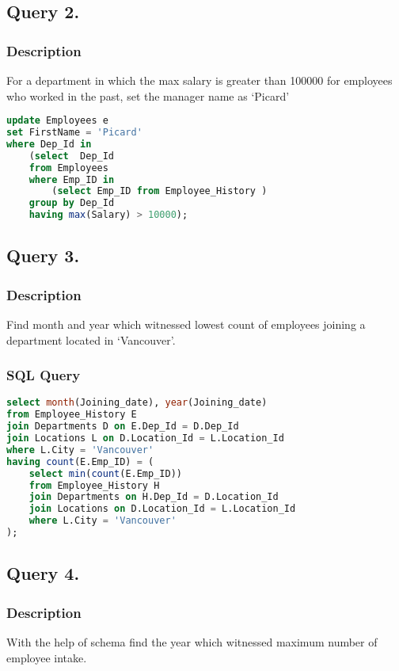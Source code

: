 \documentclass[a4paper]{article}
\begin{document}
\subsection{Query 2.}
\subsubsection{Description}
For a department in which the max salary is greater than 100000 for employees
who worked in the past, set the manager name as ‘Picard’
\begin{lstlisting}[language=SQL]
update Employees e
set FirstName = 'Picard' 
where Dep_Id in 
    (select  Dep_Id 
    from Employees
    where Emp_ID in 
        (select Emp_ID from Employee_History )
    group by Dep_Id
    having max(Salary) > 10000);
\end{lstlisting}

\newpage
\subsection{Query 3.}
\subsubsection{Description}
Find month and year which witnessed lowest count of employees joining a
department located in ‘Vancouver’.
\subsubsection{SQL Query}
\begin{lstlisting}[language=SQL]
select month(Joining_date), year(Joining_date)
from Employee_History E
join Departments D on E.Dep_Id = D.Dep_Id
join Locations L on D.Location_Id = L.Location_Id
where L.City = 'Vancouver'
having count(E.Emp_ID) = (
    select min(count(E.Emp_ID))
    from Employee_History H
    join Departments on H.Dep_Id = D.Location_Id
    join Locations on D.Location_Id = L.Location_Id
    where L.City = 'Vancouver'
);
\end{lstlisting}


\subsection{Query 4.}
\subsubsection{Description}
With the help of schema find the year which witnessed maximum number of
employee intake.
\end{document}
